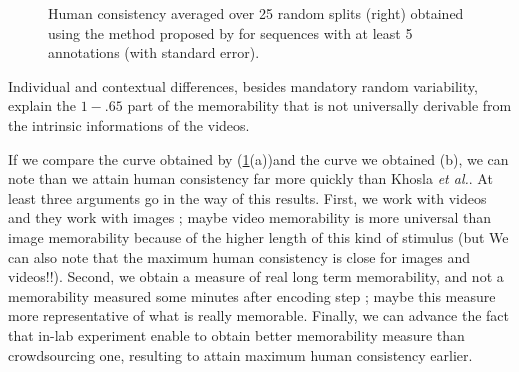 \documentclass[sigconf]{acmart}
\begin{document}
\begin{figure}[!htbp]
	\centering
	\quad
	\caption{\label{fig:human_consistency}Human consistency averaged over 25 random splits (right) obtained using the method proposed by \cite{isola_2014_makes} for sequences with at least 5 annotations (with standard error).}
\end{figure}




Individual and contextual differences, besides mandatory random variability, explain the $1-.65$ part of the memorability that is not universally derivable from the intrinsic informations of the videos.  

If we compare the curve obtained by \cite{khosla_2015_understanding} (\ref{fig:human_consistency}(a))and the curve we obtained (b), we can note than we attain human consistency far more quickly than Khosla \textit{et al.}. At least three arguments go in the way of this results. First, we work with videos and they work with images ; maybe video memorability is more universal than image memorability because of the higher length of this kind of stimulus (but We can also note that the maximum human consistency is close for images and videos!!). Second, we obtain a measure of real long term memorability, and not a memorability measured some minutes after encoding step ; maybe this measure more representative of what is really memorable. Finally, we can advance the fact that in-lab experiment enable to obtain better memorability measure than crowdsourcing one, resulting to attain maximum human consistency earlier.
\end{document}
